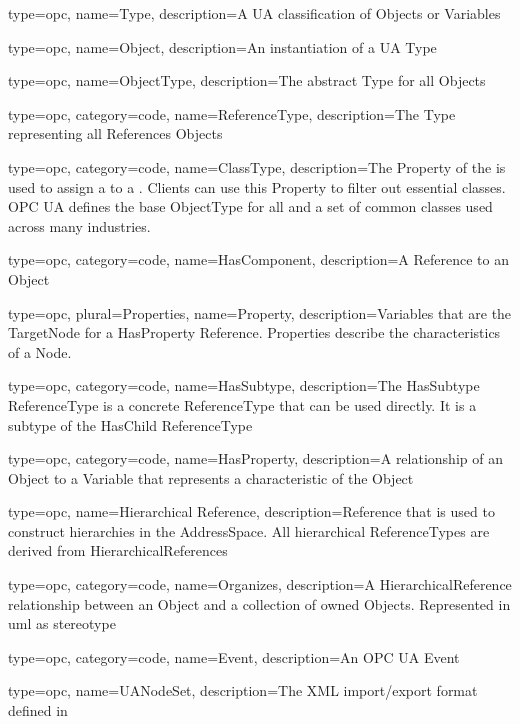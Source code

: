 {
  type=opc,
  name=Type,
  description={A UA classification of \glspl{Object} or \glspl{Variable}}
}

{
  type=opc,
  name=Object,
  description={An instantiation of a UA \gls{Type}}
}

{
  type=opc,
  name=ObjectType,
  description={The abstract \gls{Type} for all \glspl{Object}}
}

{
  type=opc,
  category=code,
  name=ReferenceType,
  description={The \gls{Type} representing all \glspl{Reference} \glspl{Object}}
}

{
  type=opc,
  category=code,
  name=ClassType,
  description={The  \gls{Property} of the  is used to assign a  to a . Clients can use this Property to filter out essential classes. OPC UA defines the base \gls{ObjectType} for all  and a set of common classes used across many industries.}
}

{
  type=opc,
  category=code,
  name=HasComponent,
  description={A \gls{Reference} to an \gls{Object}}
}

{
  type=opc,
  plural=Properties,
  name=Property,
  description={Variables that are the TargetNode for a \gls{HasProperty} Reference. Properties describe the characteristics of a Node.}
}

{
  type=opc,
  category=code,
  name=HasSubtype,
  description={The HasSubtype ReferenceType is a concrete ReferenceType that can be used directly. It is a subtype of the HasChild ReferenceType}
}

{
  type=opc,
  category=code,
  name=HasProperty,
  description={A relationship of an \gls{Object} to a \gls{Variable} that represents a characteristic of the \gls{Object}}
}

{
  type=opc,
  name={Hierarchical Reference},
  description={Reference that is used to construct hierarchies in the \gls{AddressSpace}. All hierarchical ReferenceTypes are derived from HierarchicalReferences}
}

{
  type=opc,
  category=code,
  name=Organizes,
  description={A \gls{HierarchicalReference} relationship between an \gls{Object} and a collection of owned \glspl{Object}. Represented in \gls{uml} as  \gls{stereotype}}
}

{
  type=opc,
  category=code,
  name=Event,
  description={An OPC UA Event}
}

{
  type=opc,
  name=UANodeSet,
  description={The XML import/export format defined in \cite{UAPart6}}
}



